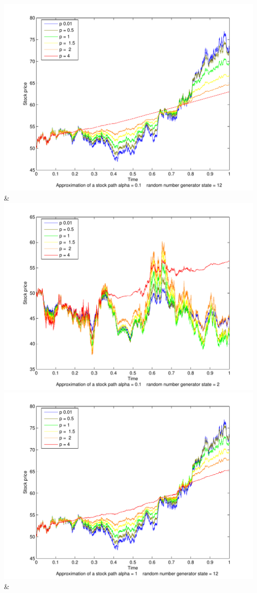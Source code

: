 \documentclass[a4paper,onecolumn]{IEEEtran}
\begin{document}
{		 \includegraphics[width=\stockplotsize]{stock_alpha0-1}&
			\includegraphics[width=\stockplotsize]{stock_s2_alpha0-1}\NN\cmidrule(lr){1-2}
		 \includegraphics[width=\stockplotsize]{stock_alpha1}&
}
\end{document}
